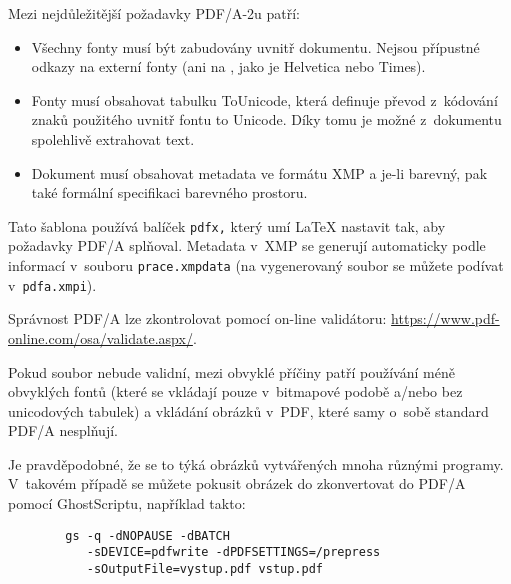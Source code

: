 Mezi nejdůležitější požadavky PDF/A-2u patří:

\begin{itemize}

\item Všechny fonty musí být zabudovány uvnitř dokumentu. Nejsou přípustné
odkazy na externí fonty (ani na , jako je Helvetica nebo Times).

\item Fonty musí obsahovat tabulku ToUnicode, která definuje převod z~kódování
znaků použitého uvnitř fontu to Unicode. Díky tomu je možné z~dokumentu
spolehlivě extrahovat text.

\item Dokument musí obsahovat metadata ve formátu XMP a je-li barevný,
pak také formální specifikaci barevného prostoru.

\end{itemize}

Tato šablona používá balíček {\tt pdfx,} který umí \LaTeX{} nastavit tak,
aby požadavky PDF/A splňoval. Metadata v~XMP se generují automaticky podle
informací v~souboru {\tt prace.xmpdata} (na vygenerovaný soubor se můžete
podívat v~{\tt pdfa.xmpi}).

Správnost PDF/A lze zkontrolovat pomocí on-line validátoru: \url{https://www.pdf-online.com/osa/validate.aspx/}.

Pokud soubor nebude validní, mezi obvyklé příčiny patří používání méně
obvyklých fontů (které se vkládají pouze v~bitmapové podobě a/nebo bez
unicodových tabulek) a vkládání obrázků v~PDF, které samy o~sobě standard
PDF/A nesplňují.

Je pravděpodobné, že se to týká obrázků vytvářených mnoha různými programy.
V~takovém případě se můžete pokusit obrázek do zkonvertovat do PDF/A pomocí
GhostScriptu, například takto:


\begin{verbatim}
        gs -q -dNOPAUSE -dBATCH
           -sDEVICE=pdfwrite -dPDFSETTINGS=/prepress
           -sOutputFile=vystup.pdf vstup.pdf
\end{verbatim}